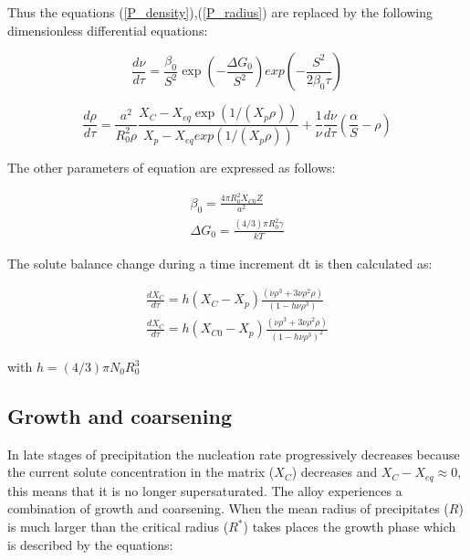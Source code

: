 \documentclass[12pt,a4paper]{article}
\begin{document}
Thus the equations (\ref{P_density}),(\ref{P_radius}) are replaced by the following dimensionless differential equations:

\begin{equation}
	\frac{d\nu}{d\tau} = \frac{\beta_0}{S^2} \exp(-\frac{\Delta G_0}{S^2}) exp(-\frac{S^2}{2\beta_0 \tau}) 
\end{equation}

\begin{equation}
	\frac{d\rho}{d\tau} = \frac{a^2}{R_0^2 \rho}\frac{X_C - X_{eq}\exp(1/(X_p\rho))}{X_p - X_{eq}exp(1/(X_p\rho))} + \frac{1}{\nu}\frac{d\nu}{d\tau}(\frac{\alpha}{S} - \rho) 
\end{equation}

The other parameters of equation are expressed as follows:

\begin{subequations}
	\begin{align}
\beta_0 = \frac{4\pi R_0^2 X_{C0}Z}{a^2} \\
\Delta G_0 = \frac{(4/3) \pi R_0^2 \gamma}{kT} 
	\end{align}	
\end{subequations}

The solute balance change during a time increment dt is then calculated as:

\begin{subequations}
	\begin{align}
\frac{dX_C}{d\tau} = h(X_C - X_p) \frac{(\dot{\nu}\rho^3 + 3\nu \rho^2 \dot{\rho})}{(1 - h \nu \rho^3)} \\ 
\frac{dX_C}{d\tau} = h(X_{C0} - X_p) \frac{(\dot{\nu}\rho^3 + 3\nu \rho^2 \dot{\rho})}{(1 - h \nu \rho^3)^2} 
	\end{align}
\end{subequations}

with $h = (4/3)\pi N_0R_0^3$

\subsection{Growth and coarsening}
In late stages of precipitation the nucleation rate progressively decreases because the current solute concentration in the matrix ($X_C$) decreases and $X_C - X_{eq} \approx 0$, this means that it is no longer supersaturated. The alloy experiences a combination of growth and coarsening. When the mean radius of precipitates ($R$) is much larger than the critical radius ($R^*$) takes places the growth phase which is described by the equations:
\end{document}
